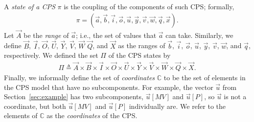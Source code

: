 \begin{definition}
\label{def:States}
A \emph{state of a CPS} $\pi$ is the coupling of the components of such CPS; formally, 
\begin{align}
\pi=(\vec{a},\vec{b},\vec{i},\vec{o},\vec{u},\vec{y},\vec{v},\vec{w},\vec{q},\vec{x}).
\end{align}
Let $\vec{A}$ be the \emph{range} of $\vec{a}$; i.e., the set of values that $\vec{a}$ can take. Similarly, we define $\vec{B}$, $\vec{I}$, $\vec{O}$, $\vec{U}$, $\vec{Y}$,  $\vec{V}$, $\vec{W}$ $\vec{Q}$, and $\vec{X}$ as the ranges of $\vec{b}$, $\vec{i}$, $\vec{o}$, $\vec{u}$, $\vec{y}$, $\vec{v}$, $\vec{w}$, and $\vec{q}$, respectively. We defined the set $\Pi$ of the CPS states by 
\begin{align}
  \Pi\triangleq \vec{A}\times\vec{B}\times\vec{I}\times\vec{O}\times\vec{U}\times\vec{Y}\times\vec{V}\times\vec{W}\times\vec{Q}\times\vec{X}.  
\end{align}
Finally, we informally define the set of \emph{coordinates} $\mathbb{C}$ to be the set of elements in the CPS model that have no subcomponents. For example, the vector $\vec{u}$ from Section~\ref{sec:example} has two subcomponents, $\vec{u}[MV]$ and $\vec{u}[P]$, so $\vec{u}$ is not a coordinate, but both $\vec{u}[MV]$ and $\vec{u}[P]$ individually are. We refer to the elements of $\mathbb{C}$ as the \emph{coordinates} of the CPS.
\end{definition}


